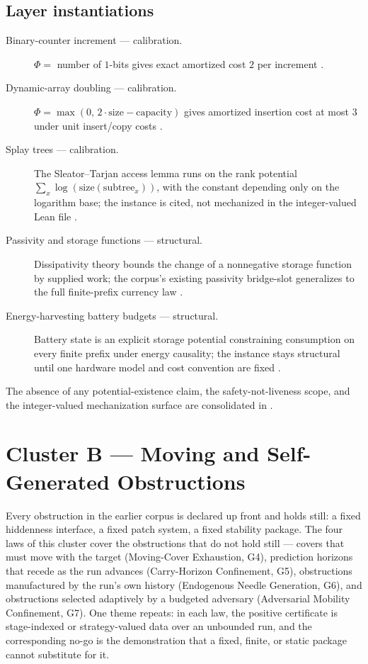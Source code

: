 \documentclass[11pt]{article}
\newcommand{\clusterB}{Moving and Self-Generated Obstructions}
\newcommand{\lawGFour}{Moving-Cover Exhaustion}
\newcommand{\lawGFive}{Carry-Horizon Confinement}
\newcommand{\lawGSix}{Endogenous Needle Generation}
\newcommand{\lawGSeven}{Adversarial Mobility Confinement}
\theoremstyle{definition}
\begin{document}
\subsection*{Layer instantiations}\label{layer-inst:G3}
\begin{description}
  \item[Binary-counter increment --- calibration.] $\Phi = $ number of $1$-bits gives exact amortized
    cost $2$ per increment \citep{Tarjan1985,CormenEtAl}.
  \item[Dynamic-array doubling --- calibration.] $\Phi = \max(0,\, 2 \cdot \mathrm{size} -
    \mathrm{capacity})$ gives amortized insertion cost at most $3$ under unit insert/copy costs
    \citep{CormenEtAl}.
  \item[Splay trees --- calibration.] The Sleator--Tarjan access lemma runs on the rank potential
    $\sum_x \log(\mathrm{size}(\mathrm{subtree}_x))$, with the constant depending only on the
    logarithm base; the instance is cited, not mechanized in the integer-valued Lean file
    \citep{SleatorTarjan1985}.
  \item[Passivity and storage functions --- structural.] Dissipativity theory bounds the change of a
    nonnegative storage function by supplied work; the corpus's existing passivity bridge-slot
    generalizes to the full finite-prefix currency law \citep{Willems1972,Tsiokos2026EmergenceCalculus}.
  \item[Energy-harvesting battery budgets --- structural.] Battery state is an explicit storage
    potential constraining consumption on every finite prefix under energy causality; the instance
    stays structural until one hardware model and cost convention are fixed
    \citep{OzelEtAl,YangUlukus}.
\end{description}

The absence of any potential-existence claim, the safety-not-liveness scope, and the integer-valued
mechanization surface are consolidated in .

\section{Cluster B --- \clusterB}\label{sec:clusterB}

Every obstruction in the earlier corpus is declared up front and holds still: a fixed hiddenness
interface, a fixed patch system, a fixed stability package. The four laws of this cluster cover the
obstructions that do not hold still --- covers that must move with the target (\lawGFour, G4),
prediction horizons that recede as the run advances (\lawGFive, G5), obstructions manufactured by the
run's own history (\lawGSix, G6), and obstructions selected adaptively by a budgeted adversary
(\lawGSeven, G7). One theme repeats: in each law, the positive certificate is stage-indexed or
strategy-valued data over an unbounded run, and the corresponding no-go is the demonstration that a
fixed, finite, or static package cannot substitute for it.
\end{document}
